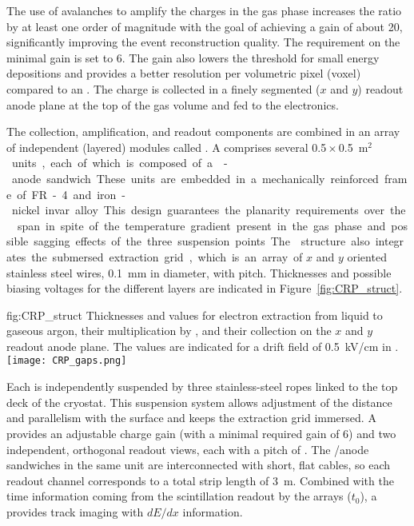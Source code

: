 The use of avalanches to amplify the charges in the gas phase increases the  ratio by at least one order of magnitude with the goal of achieving a gain of about 20, significantly improving the event reconstruction quality. The requirement on the minimal  gain is set to 6.  The gain also lowers the threshold for small energy depositions and provides a better resolution per volumetric pixel (voxel) compared to an  .  The charge is collected in a finely segmented \twod ($x$ and $y$) readout anode plane at the top of the gas volume and fed to the  electronics.   

The  collection, amplification, and readout components are combined in an array of independent (layered) modules called . A  comprises several \num{0.5}\,$\times$\,\SI{0.5}{m$^2$} units, each of which is composed  of a -anode sandwich.  These units are embedded in a mechanically reinforced frame of FR-4 and iron-nickel invar alloy. This design guarantees the planarity requirements over the  span in spite of the temperature gradient present in the gas phase and possible sagging effects of the three suspension points. The  structure also integrates  the submersed extraction grid, which is an array of $x$ and $y$ oriented stainless steel wires, \SI{0.1}{mm} in diameter, with \dpstrippitch pitch. Thicknesses and possible biasing voltages for the different layers are indicated in Figure~\ref{fig:CRP_struct}.

\begin{dunefigure}{fig:CRP_struct}
{Thicknesses and  values for electron extraction from liquid to gaseous argon, their  multiplication by , and their collection on the $x$ and $y$ readout anode plane. The  values are indicated for a drift field of \SI{0.5}{kV/cm} in .}
\texttt{[image: CRP\_gaps.png]}
\end{dunefigure}

Each  is independently suspended by three stainless-steel ropes linked to the top deck of the cryostat. This suspension system allows adjustment of the  distance and parallelism with the  surface and keeps the extraction grid immersed. A  provides an adjustable charge gain (with a minimal required gain of \num{6}) and two independent, orthogonal readout views, each with a pitch of \dpstrippitch.  The /anode sandwiches  in the same  unit are interconnected with short, flat cables, so each readout channel corresponds to a total strip length of \SI{3}{m}. Combined with the time information coming from the  scintillation readout by the  arrays ($t_0$), a  provides \threed track imaging with $dE/dx$ information.  

